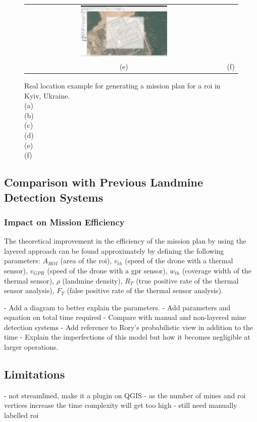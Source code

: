 \begin{figure}[h]
\begin{tabular}{cc}
        \includegraphics[width=0.45\textwidth]{figs/Jihwan/eg6.png} \\
        (e) & (f)
    \end{tabular}
    \caption[Real Location Example for Mission Planning]
    {Real location example for generating a mission plan for a \gls{roi} in Kyiv, Ukraine. \\
    (a) \\
    (b) \\
    (c) \\
    (d) \\
    (e) \\
    (f) 
    }
    \label{fig:msp_example}
\end{figure}

\subsection{Comparison with Previous Landmine Detection Systems}
\label{sec:msp_comparison_manual_demining}

\subsubsection{Impact on Mission Efficiency}

The theoretical improvement in the efficiency of the mission plan by using the layered approach can be found approximately by defining the following parameters: $A_{ROI}$ (area of the \gls{roi}), $v_{th}$ (speed of the drone with a thermal sensor), $v_{GPR}$ (speed of the drone with a \gls{gpr} sensor), $w_{th}$ (coverage width of the thermal sensor), $\rho$ (landmine density), $R_T$ (true positive rate of the thermal sensor analysis), $F_T$ (false positive rate of the thermal sensor analysis). 

- Add a diagram to better explain the parameters. 
- Add parameters and equation on total time required
- Compare with manual and non-layered mine detection systems
- Add reference to Rory's probabilistic view in addition to the time
- Explain the imperfections of this model but how it becomes negligible at larger operations. 

\subsection{Limitations}
\label{sec:msp_limitations}

- not streamlined, make it a plugin on QGIS
- as the number of mines and roi vertices increase the time complexity will get too high
- still need manually labelled roi 